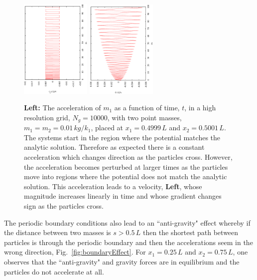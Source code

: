 \documentclass[10pt,a4paper]{article}
\begin{document}
\begin{figure}[h!]
\begin{center}
\includegraphics[width =0.3\textwidth, angle =-90]{accAnalytic.eps}
\includegraphics[width =0.3\textwidth, angle =-90]{velAnalytic.eps}
\caption{\textbf{Left: }The acceleration of $m_1$ as a function of time, $t$, in a high resolution grid, $N_g = 10000$, with two point masses, $m_1=m_2=0.01\, kg/k_1$, placed at $x_1=0.4999\,L$ and $x_2 = 0.5001\,L$. The systems start in the region where the potential matches the analytic solution. Therefore as expected there is a constant acceleration which changes direction as the particles cross. However, the acceleration becomes perturbed at larger times as the particles move into regions where the potential does not match the analytic solution. This acceleration leads to a velocity, \textbf{Left}, whose magnitude increases linearly in time and whose gradient changes sign as the particles cross.}
\label{fig:velAccAnalytic}
\end{center}
\end{figure}
The periodic boundary conditions also lead to an ``anti-gravity" effect whereby if the distance between two masses is $s > 0.5\, L$ then the shortest path between particles is through the periodic boundary and then the accelerations seem in the wrong direction,  Fig.~\ref{fig:boundaryEffect}. For $x_1 = 0.25\, L$ and  $x_2 = 0.75\, L$, one observes that the ``anti-gravity" and gravity forces are in equilibrium and the particles do not accelerate at all. 
\end{document}
